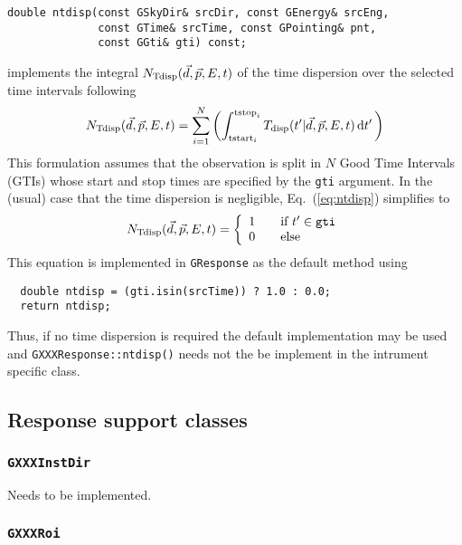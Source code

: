\documentclass{article}[12pt,a4]
\begin{document}
\begin{verbatim}
double ntdisp(const GSkyDir& srcDir, const GEnergy& srcEng,
              const GTime& srcTime, const GPointing& pnt,
              const GGti& gti) const;
\end{verbatim}
implements the integral $N_{\rm Tdisp}(\vec{d}, \vec{p}, E, t)$ of the time dispersion
over the selected time intervals following
\begin{equation}
N_{\rm Tdisp}(\vec{d}, \vec{p}, E, t) = 
\sum_{i=1}^N \left(
\int_{{\rm tstart}_i}^{{\rm tstop}_i}
T_{\rm disp}(t' | \vec{d}, \vec{p}, E, t) \, {\rm d}t' \,
\right)
\label{eq:ntdisp}
\end{equation}
This formulation assumes that the observation is split in $N$ Good Time
Intervals (GTIs) whose start and stop times are specified by the {\tt gti} argument.
In the (usual) case that the time dispersion is negligible, Eq.~(\ref{eq:ntdisp}) simplifies to
\begin{equation}
N_{\rm Tdisp}(\vec{d}, \vec{p}, E, t) = \left\{ 
\begin{array}{l l}
  1 & \quad \mbox{if $t' \in {\tt gti}$}\\
  0 & \quad \mbox{else}\\ \end{array} \right.
\end{equation}
This equation is implemented in {\tt GResponse} as the default method using
\begin{verbatim}
  double ntdisp = (gti.isin(srcTime)) ? 1.0 : 0.0;
  return ntdisp;
\end{verbatim}
Thus, if no time dispersion is required the default implementation may be used
and {\tt GXXXResponse::ntdisp()} needs not the be implement in the
intrument specific class.


\subsection{Response support classes}

\subsubsection{{\tt GXXXInstDir}}
\label{sec:GInstDir}

Needs to be implemented.


\subsubsection{{\tt GXXXRoi}}
\label{sec:GRoi}
\end{document}
